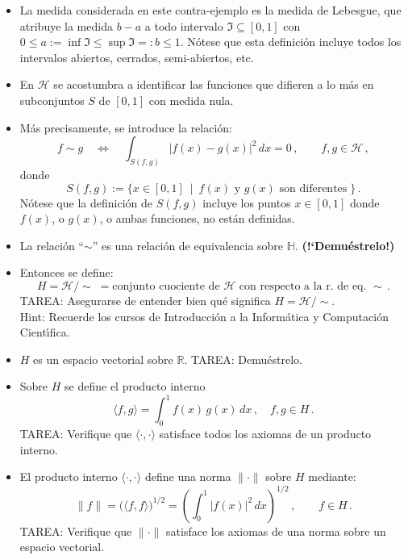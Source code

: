 \documentclass[12pt,reqno]{amsart}
\begin{document}
\begin{enumerate}
\begin{itemize}
\item
La medida considerada en este contra-ejemplo es la medida de Lebesgue,
que atribuye la medida $b-a$ a todo intervalo
$\mathfrak{I}\subseteq[0,1]$ con 
$0\leq a:=\inf\mathfrak{I}\leq\sup\mathfrak{I}=:b\leq1$.
N\'otese que esta definici\'on incluye todos los intervalos abiertos,
cerrados, semi-abiertos, etc.

\item
En $\mathcal{H}$ se acostumbra a identificar las funciones que
difieren a lo m\'as en subconjuntos $S$ de $[0,1]$ con medida nula.

\item
M\'as precisamente, se introduce la relaci\'on:
$$
f\sim g \quad\Leftrightarrow\quad
\int_{S(f,g)} |f(x)-g(x)|^2\,dx=0\,,\qquad f,g\in\mathcal{H}\,,
$$
donde
$$
S(f,g):=\big\{ x\in[0,1]\ \mid\ 
\text{$f(x)$ y $g(x)$ son diferentes}\;\big\}\,.
$$
N\'otese que la definici\'on de $S(f,g)$ incluye los puntos
$x\in[0,1]$ donde $f(x)$, o $g(x)$, o ambas funciones, no est\'an
definidas.

\item
La relaci\'on ``$\sim$'' es una relaci\'on de equivalencia sobre
$\mathbb{H}$. {\bf (!`Demu\'estrelo!)}

\item
Entonces se define:
$$
H = \mathcal{H}/\!\!\sim\; 
= \text{conjunto cuociente de $\mathcal{H}$ 
        con respecto a la r. de eq. $\sim$}\,.
$$
TAREA: Asegurarse de entender bien qu\'e significa
$H = \mathcal{H}/\!\!\sim$. \\
Hint: Recuerde los cursos de Introducci\'on a
la Inform\'atica y Computaci\'on Cient\'\i fica.

\item
$H$ es un espacio vectorial sobre $\mathbb{R}$.
TAREA: Demu\'estrelo.

\item
Sobre $H$ se define el producto interno
$$
\langle f,g \rangle = \displaystyle \int_0^1 f(x)\,g(x)\,dx\,,\quad
f,g\in H\,.
$$
TAREA: Verifique que $\langle\cdot,\cdot\rangle$ satisface todos los
axiomas de un producto interno.

\item
El producto interno $\langle\cdot,\cdot\rangle$ define una norma
$\|\cdot\|$ sobre $H$ mediante:
$$
\|f\|=\big( \langle f,f\rangle \big)^{1/2}
= \left( \int_0^1|f(x)|^2\,dx \right)^{1/2}\,,\qquad f\in H\,.
$$
TAREA: Verifique que $\|\cdot\|$ satisface los axiomas de una norma
sobre un espacio vectorial.


\end{itemize}
\end{enumerate}
\end{document}
